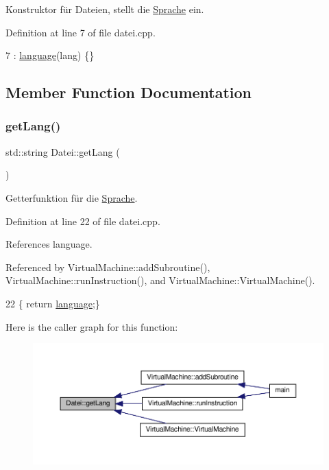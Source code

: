 Konstruktor für Dateien, stellt die \mbox{\hyperlink{class_sprache}{Sprache}} ein. 

Definition at line 7 of file datei.\+cpp.


\begin{DoxyCode}
7 : \mbox{\hyperlink{class_datei_a49b90e65e1e9523b2a61e370727d9510}{language}}(lang) \{\}
\end{DoxyCode}


\subsection{Member Function Documentation}
\mbox{\label{class_datei_aeeaf8e269f4d2b53e209ad905b5b75c5}} 
\subsubsection{\texorpdfstring{get\+Lang()}{getLang()}}
{\footnotesize\ttfamily std\+::string Datei\+::get\+Lang (\begin{DoxyParamCaption}{ }\end{DoxyParamCaption})}

Getterfunktion für die \mbox{\hyperlink{class_sprache}{Sprache}}. 

Definition at line 22 of file datei.\+cpp.



References language.



Referenced by Virtual\+Machine\+::add\+Subroutine(), Virtual\+Machine\+::run\+Instruction(), and Virtual\+Machine\+::\+Virtual\+Machine().


\begin{DoxyCode}
22 \{ \textcolor{keywordflow}{return} \mbox{\hyperlink{class_datei_a49b90e65e1e9523b2a61e370727d9510}{language}};\}
\end{DoxyCode}
Here is the caller graph for this function\+:
\nopagebreak
\begin{figure}[H]
\begin{center}
\leavevmode
\includegraphics[width=350pt]{class_datei_aeeaf8e269f4d2b53e209ad905b5b75c5_icgraph}
\end{center}
\end{figure}
\mbox{\label{class_datei_a5dedc9776ebe637f0842300f648d4b17}} 
